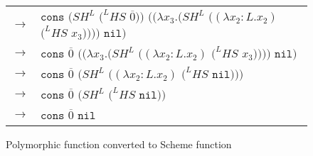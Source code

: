 \begin{figure}[tb]
\begin{tabular}{ll}
\vspace{5pt}

$\rightarrow$ & $\mathtt{cons}$ $(SH^{L}$ $(^{L}HS$ $\overline{0}))$ $((\lambda x_{3}.(SH^{L}$ $((\lambda x_{2}:L.x_{2})$ $(^{L}HS$ $x_{3}))))$ $\mathtt{nil})$ \\

\vspace{5pt}

$\rightarrow$ & $\mathtt{cons}$ $\overline{0}$ $((\lambda x_{3}.(SH^{L}$ $((\lambda x_{2}:L.x_{2})$ $(^{L}HS$ $x_{3}))))$ $\mathtt{nil})$ \\

\vspace{5pt}

$\rightarrow$ & $\mathtt{cons}$ $\overline{0}$ $(SH^{L}$ $((\lambda x_{2}:L.x_{2})$ $(^{L}HS$ $\mathtt{nil})))$ \\

\vspace{5pt}

$\rightarrow$ & $\mathtt{cons}$ $\overline{0}$ $(SH^{L}$ $(^{L}HS$ $\mathtt{nil}))$ \\

\vspace{5pt}

$\rightarrow$ & $\mathtt{cons}$ $\overline{0}$ $\mathtt{nil}$
\end{tabular}
\caption{Polymorphic function converted to Scheme function}
\label{forall-3}
\end{figure}
